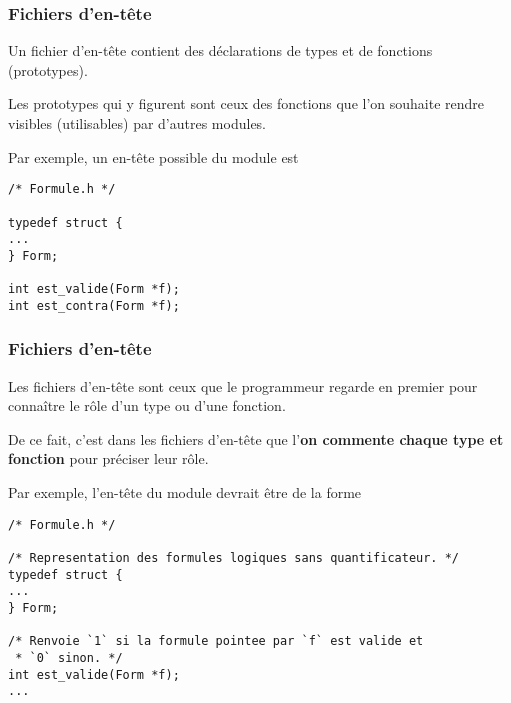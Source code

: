 \begin{frame}[fragile]
\frametitle{Fichiers d'en-tête}
Un fichier d'en-tête contient des \alert{déclarations} de types et
de fonctions (prototypes).
\bigskip

Les prototypes qui y figurent sont ceux des fonctions que l'on
souhaite rendre visibles (utilisables) par d'autres modules.
\bigskip

Par exemple, un en-tête possible du module  est
\medskip

\begin{minipage}[c]{.4\textwidth}
\begin{lstlisting}[frame=single,numbers=none]
/* Formule.h */

typedef struct {
...
} Form;

int est_valide(Form *f);
int est_contra(Form *f);
\end{lstlisting}
\end{minipage}
\end{frame}

\begin{frame}[fragile]
\frametitle{Fichiers d'en-tête}
Les fichiers d'en-tête sont ceux que le programmeur regarde en premier
pour connaître le \alert{rôle d'un type ou d'une fonction}.
\medskip

De ce fait, c'est dans les fichiers d'en-tête que l'{\bf on commente chaque
type et fonction} pour préciser leur rôle.
\medskip

Par exemple, l'en-tête du module  devrait être de la forme
\medskip

\begin{minipage}[c]{.9\textwidth}
\begin{lstlisting}[frame=single,numbers=none]
/* Formule.h */

/* Representation des formules logiques sans quantificateur. */
typedef struct {
...
} Form;

/* Renvoie `1` si la formule pointee par `f` est valide et
 * `0` sinon. */
int est_valide(Form *f);
...
\end{lstlisting}
\end{minipage}
\end{frame}

